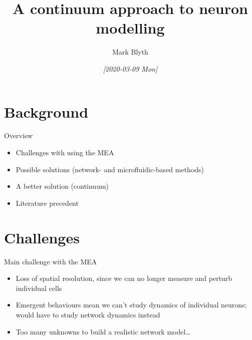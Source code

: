 \documentclass[presentation]{beamer}
\author{Mark Blyth}
\date{\textit{[2020-03-09 Mon]}}
\title{A continuum approach to neuron modelling}
\begin{document}
\maketitle

\section{Background}
\label{sec:org7f31c62}
\begin{frame}[label={sec:orga6d73b5}]{Overview}
\begin{itemize}
\item Challenges with using the MEA
\item Possible solutions (network- and microfluidic-based methods)
\item A better solution (continuum)
\item Literature precedent
\end{itemize}
\end{frame}

\section{Challenges}
\label{sec:org433c7db}
\begin{frame}[label={sec:org2a7da5b}]{Main challenge with the MEA}
\begin{itemize}
\item Loss of spatial resolution, since we can no longer measure and perturb individual cells
\item Emergent behaviours mean we can't study dynamics of individual neurons; would have to study network dynamics instead
\item Too many unknowns to build a realistic network model\ldots{}
\end{itemize}
\end{frame}
\end{document}
